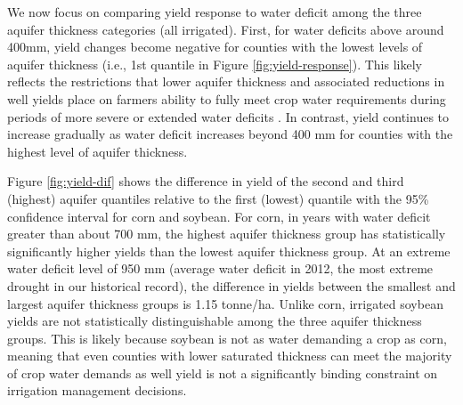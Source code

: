 \documentclass[
]{article}
\begin{document}
We now focus on comparing yield response to water deficit among the three aquifer thickness categories (all irrigated). First, for water deficits above around 400mm, yield changes become negative for counties with the lowest levels of aquifer thickness (i.e., 1st quantile in Figure \ref{fig:yield-response}). This likely reflects the restrictions that lower aquifer thickness and associated reductions in well yields place on farmers ability to fully meet crop water requirements during periods of more severe or extended water deficits \citetext{\citealp[\citet{foster2014modeling}]{rad2020effects}; \citealp{hrozencik2017heterogeneous}}. In contrast, yield continues to increase gradually as water deficit increases beyond 400 mm for counties with the highest level of aquifer thickness.

Figure \ref{fig:yield-dif} shows the difference in yield of the second and third (highest) aquifer quantiles relative to the first (lowest) quantile with the 95\% confidence interval for corn and soybean. For corn, in years with water deficit greater than about 700 mm, the highest aquifer thickness group has statistically significantly higher yields than the lowest aquifer thickness group. At an extreme water deficit level of 950 mm (average water deficit in 2012, the most extreme drought in our historical record), the difference in yields between the smallest and largest aquifer thickness groups is 1.15 tonne/ha. Unlike corn, irrigated soybean yields are not statistically distinguishable among the three aquifer thickness groups. This is likely because soybean is not as water demanding a crop as corn, meaning that even counties with lower saturated thickness can meet the majority of crop water demands as well yield is not a significantly binding constraint on irrigation management decisions.
\end{document}
